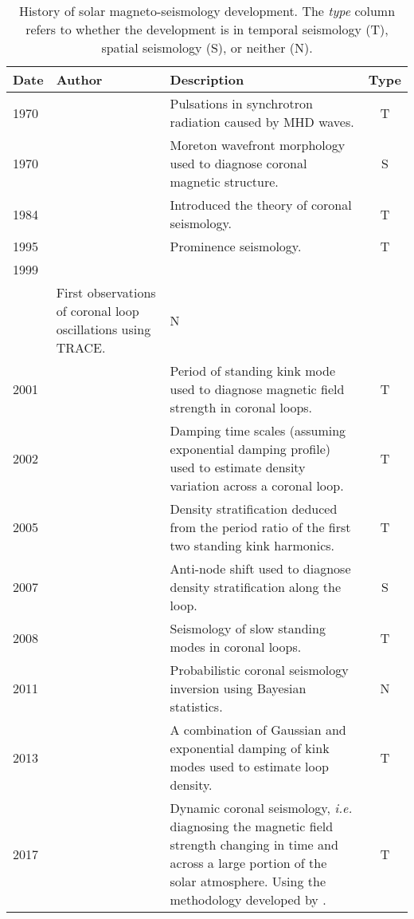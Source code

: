 \begin{table}
	\centering
	\begin{tabularx}{\linewidth}{l l X c}
		\toprule
		Date & Author & Description & Type \\
		\midrule
		1970 & \citeauthor{ros70} & Pulsations in synchrotron radiation caused by MHD waves. & T \\
		1970 & \citeauthor{uch70} & Moreton wavefront morphology used to diagnose coronal magnetic structure. & S \\
		1984 & \citeauthor{rob_etal84} & Introduced the theory of coronal seismology. & T \\
		1995 & \citeauthor{tan95} & Prominence seismology. & T \\
		1999 & \makecell[tl]{\citeauthor{asc_etal99} \\ \citeauthor{nak_etal99}}  & First observations of coronal loop oscillations using TRACE. & N \\
		2001 & \citetalias{nak_etal01} & Period of standing kink mode used to diagnose magnetic field strength in coronal loops. & T \\
		2002 & \citeauthor{goo_etal02} & Damping time scales (assuming exponential damping profile) used to estimate density variation across a coronal loop. & T \\
		2005 & \citeauthor{and_etal05} & Density stratification deduced from the period ratio of the first two standing kink harmonics. & T \\
		2007 & \citeauthor{ver_etal07} & Anti-node shift used to diagnose density stratification along the loop. & S \\
		2008 & \citetalias{erd_etal08} & Seismology of slow standing modes in coronal loops. & T \\
		2011 & \citetalias{arr_etal11} & Probabilistic coronal seismology inversion using Bayesian statistics. & N \\
		2013 & \citeauthor{pas_etal13} & A combination of Gaussian and exponential damping of kink modes used to estimate loop density. & T \\
		2017 & \citeauthor{lon_etal17} & Dynamic coronal seismology, \textit{i.e.} diagnosing the magnetic field strength changing in time and across a large portion of the solar atmosphere. Using the methodology developed by \cite{mor_etal15}. & T \\
		\bottomrule
	\end{tabularx}
	\caption{History of solar magneto-seismology development. The \textit{type} column refers to whether the development is in temporal seismology (T), spatial seismology (S), or neither (N).}
	\label{table: SMS history}
\end{table}

